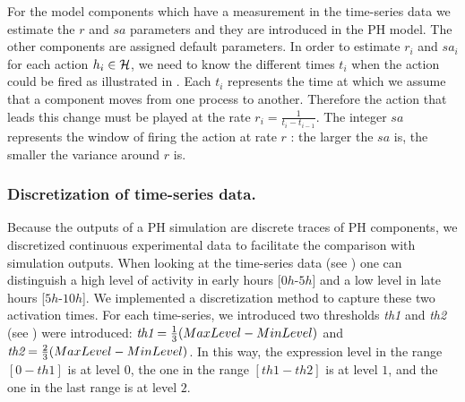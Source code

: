 For the model components which have a measurement in the time-series data we estimate the $r$ and $sa$ parameters and they are introduced in the PH model. 
The other components are 
assigned default parameters. In order to estimate $r_{i}$ and $sa_{i}$ for each action $h_{i} \in \mathcal{H}$, we need to know the different times $t_{i}$  when the action could be fired as illustrated 
in . Each  $t_{i}$ represents the time at which we assume that a component moves from one process to another. Therefore the action that leads this 
change must be played at the rate $r_{i}=\frac{1}{t_{i}-t_{i-1}}$. The integer $sa$ represents the window of firing the action at rate $r$ : the larger the $sa$ is, the smaller the variance around $r$ is. 

\subsubsection{Discretization of time-series data.}

Because the outputs of a PH simulation are discrete traces of PH components, we discretized continuous experimental data to facilitate 
the comparison with simulation outputs.
When looking at the time-series data (see ) one can distinguish a high level of
activity in early hours [$0h$-$5h$] and a low level in late hours [$5h$-$10h$]. 
We implemented a discretization method to capture these
two activation times. For each time-series, we introduced two thresholds \emph{th1} and \emph{th2} (see ) were introduced: 
$\emph{th1}=\frac{1}{3}(MaxLevel-MinLevel)$ and $\emph{th2}=\frac{2}{3}(MaxLevel-MinLevel)$. 
In this way, the expression level in the range $[0-th1]$ is at level $0$, the one in the range $[th1-th2]$ is at level $1$, and the one in the last range is at
level $2$. 


